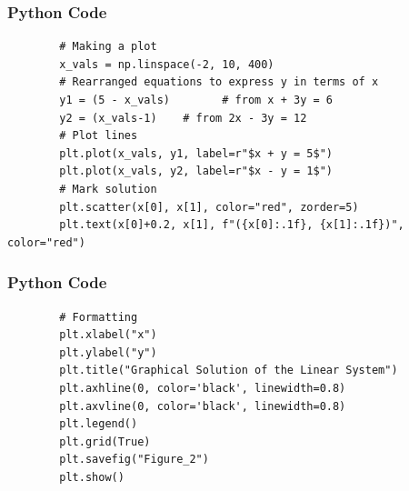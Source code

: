 \documentclass{beamer}
\begin{document}
\begin{frame}[fragile]
	\frametitle{Python Code}
	\begin{lstlisting}
		# Making a plot
		x_vals = np.linspace(-2, 10, 400)
		# Rearranged equations to express y in terms of x
		y1 = (5 - x_vals)        # from x + 3y = 6
		y2 = (x_vals-1)    # from 2x - 3y = 12
		# Plot lines
		plt.plot(x_vals, y1, label=r"$x + y = 5$")
		plt.plot(x_vals, y2, label=r"$x - y = 1$")
		# Mark solution
		plt.scatter(x[0], x[1], color="red", zorder=5)
		plt.text(x[0]+0.2, x[1], f"({x[0]:.1f}, {x[1]:.1f})", color="red")
	\end{lstlisting}
	
\end{frame}
\begin{frame}[fragile]
	\frametitle{Python Code}
	\begin{lstlisting}
		# Formatting
		plt.xlabel("x")
		plt.ylabel("y")
		plt.title("Graphical Solution of the Linear System")
		plt.axhline(0, color='black', linewidth=0.8)
		plt.axvline(0, color='black', linewidth=0.8)
		plt.legend()
		plt.grid(True)
		plt.savefig("Figure_2")
		plt.show()
	\end{lstlisting}
	
\end{frame}
\end{document}

